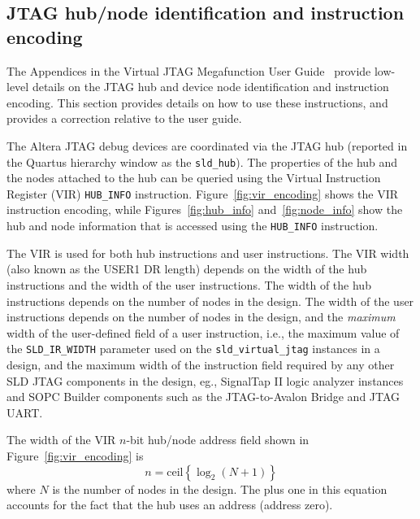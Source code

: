 \documentclass[10pt,twoside]{article}
\begin{document}
\clearpage
\subsection{JTAG hub/node identification and instruction encoding}
\label{sec:vir_encoding}

The Appendices in the Virtual JTAG Megafunction User
Guide~\cite{Altera_Virtual_JTAG_2008} provide low-level
details on the JTAG hub and device node identification
and instruction encoding. This section provides details
on how to use these instructions, and provides a correction
relative to the user guide.

The Altera JTAG debug devices are coordinated via the JTAG
hub (reported in the Quartus hierarchy window as the 
\verb+sld_hub+). The properties of the hub and the nodes
attached to the hub can be queried using the Virtual
Instruction Register (VIR) \verb+HUB_INFO+ instruction.
Figure~\ref{fig:vir_encoding} shows the VIR instruction
encoding, while Figures~\ref{fig:hub_info} 
and~\ref{fig:node_info} show the hub and node information
that is accessed using the \verb+HUB_INFO+ instruction.

The VIR is used for both hub instructions and user instructions. 
The VIR width (also known as the USER1 DR length) depends on the
width of the hub instructions and the width of the user instructions.
The width of the hub instructions depends on the number of nodes in the
design. The width of the user instructions depends on
the number of nodes in the design, and the {\em maximum}
width of the user-defined field of a user instruction, i.e., 
the maximum value of the \verb+SLD_IR_WIDTH+ parameter used on the
\verb+sld_virtual_jtag+ instances in a design, and the
maximum width of the instruction field required by any
other SLD JTAG components in the design, eg., SignalTap II logic
analyzer instances and SOPC Builder components such 
as the JTAG-to-Avalon Bridge and JTAG UART.

The width of the VIR $n$-bit hub/node address field shown in
Figure~\ref{fig:vir_encoding} is
%
\begin{equation}
n = \mbox{ceil}\left\{\log_2(N+1)\right\}
\label{eq:vir_width_n}
\end{equation}
%
where $N$ is the number of nodes in the design. The plus one
in this equation accounts for the fact that the hub uses an 
address (address zero). 
\end{document}
